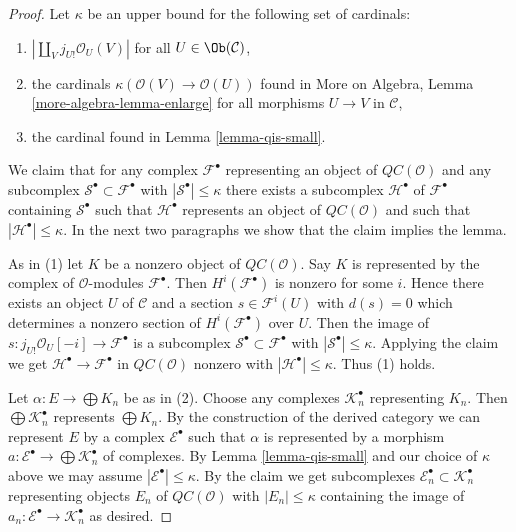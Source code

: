 \begin{proof}
Let $\kappa$ be an upper bound for the following set of cardinals:
\begin{enumerate}
\item $|\coprod_V j_{U!}\mathcal{O}_U(V)|$ for all $U \in \Ob(\mathcal{C})$,
\item the cardinals $\kappa(\mathcal{O}(V) \to \mathcal{O}(U))$
found in More on Algebra, Lemma \ref{more-algebra-lemma-enlarge}
for all morphisms $U \to V$ in $\mathcal{C}$,
\item the cardinal found in Lemma \ref{lemma-qis-small}.
\end{enumerate}
We claim that for any complex $\mathcal{F}^\bullet$ representing an object of
$\mathit{QC}(\mathcal{O})$ and any subcomplex
$\mathcal{S}^\bullet \subset \mathcal{F}^\bullet$
with $|\mathcal{S}^\bullet| \leq \kappa$ there exists a subcomplex
$\mathcal{H}^\bullet$ of $\mathcal{F}^\bullet$ containing $\mathcal{S}^\bullet$
such that $\mathcal{H}^\bullet$ represents an object of
$\mathit{QC}(\mathcal{O})$
and such that $|\mathcal{H}^\bullet| \leq \kappa$.
In the next two paragraphs we show that the claim implies the lemma.

\medskip\noindent
As in (1) let $K$ be a nonzero object of $\mathit{QC}(\mathcal{O})$.
Say $K$ is represented by the complex
of $\mathcal{O}$-modules $\mathcal{F}^\bullet$. Then $H^i(\mathcal{F}^\bullet)$
is nonzero for some $i$. Hence there exists an object $U$ of $\mathcal{C}$
and a section $s \in \mathcal{F}^i(U)$ with $d(s) = 0$ which determines a
nonzero section of $H^i(\mathcal{F}^\bullet)$ over $U$. Then the image
of $s : j_{U!}\mathcal{O}_U[-i] \to \mathcal{F}^\bullet$ is a subcomplex
$\mathcal{S}^\bullet \subset \mathcal{F}^\bullet$ with
$|\mathcal{S}^\bullet| \leq \kappa$. Applying the claim we get
$\mathcal{H}^\bullet \to \mathcal{F}^\bullet$ in
$\mathit{QC}(\mathcal{O})$ nonzero
with $|\mathcal{H}^\bullet| \leq \kappa$. Thus (1) holds.

\medskip\noindent
Let $\alpha : E \to \bigoplus K_n$ be as in (2).
Choose any complexes $\mathcal{K}_n^\bullet$ representing $K_n$.
Then $\bigoplus \mathcal{K}_n^\bullet$ represents $\bigoplus K_n$.
By the construction of the derived category we can represent
$E$ by a complex $\mathcal{E}^\bullet$ such that $\alpha$
is represented by a morphism
$a : \mathcal{E}^\bullet \to \bigoplus \mathcal{K}_n^\bullet$
of complexes. By Lemma \ref{lemma-qis-small} and our choice of
$\kappa$ above we may assume
$|\mathcal{E}^\bullet| \leq \kappa$. By the claim
we get subcomplexes $\mathcal{E}_n^\bullet \subset \mathcal{K}_n^\bullet$
representing objects $E_n$ of
$\mathit{QC}(\mathcal{O})$ with $|E_n| \leq \kappa$
containing the image of $a_n : \mathcal{E}^\bullet \to \mathcal{K}_n^\bullet$
as desired.


\end{proof}
